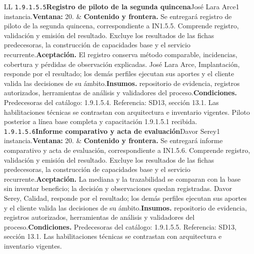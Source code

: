 \begin{longtable}{L{\tabcolsep\relax}L{\tabcolsep\relax}}
\texttt{1.\allowbreak{}9.\allowbreak{}1.\allowbreak{}5.\allowbreak{}5}\newline{}\textbf{Registro de piloto de la segunda quincena}\newline{}José Lara Arce\newline{}1 instancia.\newline{}\textbf{Ventana:} 20. & \textbf{Contenido y frontera.} Se entregará registro de piloto de la segunda quincena, correspondiente a IN1.5.5. Comprende registro, validación y emisión del resultado. Excluye los resultados de las fichas predecesoras, la construcción de capacidades base y el servicio recurrente.\newline{}\textbf{Aceptación.} El registro conserva método comparable, incidencias, cobertura y pérdidas de observación explicadas. José Lara Arce, Implantación, responde por el resultado; los demás perfiles ejecutan sus aportes y el cliente valida las decisiones de su ámbito.\newline{}\textbf{Insumos.} repositorio de evidencia, registros autorizados, herramientas de análisis y validadores del proceso.\newline{}\textbf{Condiciones.} Predecesoras del catálogo: 1.9.1.5.4. Referencia: SD13, sección 13.1. Las habilitaciones técnicas se contrastan con arquitectura e inventario vigentes. Piloto posterior a línea base completa y capacitación 1.9.1.5.1 recibida.\\\hline
\texttt{1.\allowbreak{}9.\allowbreak{}1.\allowbreak{}5.\allowbreak{}6}\newline{}\textbf{Informe comparativo y acta de evaluación}\newline{}Davor Serey\newline{}1 instancia.\newline{}\textbf{Ventana:} 20. & \textbf{Contenido y frontera.} Se entregará informe comparativo y acta de evaluación, correspondiente a IN1.5.6. Comprende registro, validación y emisión del resultado. Excluye los resultados de las fichas predecesoras, la construcción de capacidades base y el servicio recurrente.\newline{}\textbf{Aceptación.} La mediana y la trazabilidad se comparan con la base sin inventar beneficio; la decisión y observaciones quedan registradas. Davor Serey, Calidad, responde por el resultado; los demás perfiles ejecutan sus aportes y el cliente valida las decisiones de su ámbito.\newline{}\textbf{Insumos.} repositorio de evidencia, registros autorizados, herramientas de análisis y validadores del proceso.\newline{}\textbf{Condiciones.} Predecesoras del catálogo: 1.9.1.5.5. Referencia: SD13, sección 13.1. Las habilitaciones técnicas se contrastan con arquitectura e inventario vigentes.\\\hline

\end{longtable}

